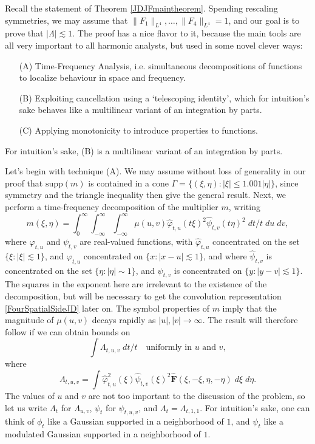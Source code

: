 \documentclass[12pt]{article}
\newcommand*{\F}{\mathbf{F}}
\begin{document}
Recall the statement of Theorem \ref{JDJFmaintheorem}. Spending rescaling symmetries, we may assume that $\| F_1 \|_{L^4}, \dots, \| F_4 \|_{L^4} = 1$, and our goal is to prove that $|\Lambda| \lesssim 1$. The proof has a nice flavor to it, because the main tools are all very important to all harmonic analysts, but used in some novel clever ways:
%
\begin{enumerate}
    \item[(A)] Time-Frequency Analysis, i.e. simultaneous decompositions of functions to localize behaviour in space and frequency.

    \item[(B)] Exploiting cancellation using a `telescoping identity', which for intuition's sake behaves like a multilinear variant of an integration by parts.

    \item[(C)] Applying monotonicity to introduce properties to functions.
\end{enumerate}
%
For intuition's sake, (B) is a multilinear variant of an integration by parts.

Let's begin with technique (A). We may assume without loss of generality in our proof that $\text{supp}(m)$ is contained in a cone $\Gamma = \{ (\xi,\eta): |\xi| \leq 1.001 |\eta| \}$, since symmetry and the triangle inequality then give the general result. Next, we perform a time-frequency decomposition of the multiplier $m$, writing
%
\[ m(\xi,\eta) = \int_0^\infty \int_{-\infty}^\infty \int_{-\infty}^\infty \mu(u,v) \widehat{\varphi}_{t,u}(t\xi)^2 \widehat{\psi}_{t,v}(t\eta)^2\; dt/t\; du\; dv, \]
%
where $\varphi_{t,u}$ and $\psi_{t,v}$ are real-valued functions, with $\widehat{\varphi}_{t,u}$ concentrated on the set $\{ \xi : |\xi| \lesssim 1 \}$, and $\varphi_{t,u}$ concentrated on $\{ x : |x - u| \lesssim 1 \}$, and where $\widehat{\psi}_{t,v}$ is concentrated on the set $\{ \eta : |\eta| \sim 1 \}$, and $\psi_{t,v}$ is concentrated on $\{ y : |y - v| \lesssim 1 \}$. The squares in the exponent here are irrelevant to the existence of the decomposition, but will be necessary to get the convolution representation \eqref{FourSpatialSideJD} later on. The symbol properties of $m$ imply that the magnitude of $\mu(u,v)$ decays rapidly as $|u|, |v| \to \infty$. The result will therefore follow if we can obtain bounds on
%
\[ \int \Lambda_{t,u,v}\; dt/t \quad\text{uniformly in $u$ and $v$}, \]
%
where
%
\[ \Lambda_{t,u,v} = \int \widehat{\varphi}_{t,u}^2(\xi) \widehat{\psi}_{t,v}(\xi)^2 \widehat{\F}(\xi,-\xi,\eta,-\eta)\; d\xi\; d\eta. \]
%
The values of $u$ and $v$ are not too important to the discussion of the problem, so let us write $\Lambda_t$ for $\Lambda_{u,v}$, $\psi_t$ for $\psi_{t,u,v}$, and $\Lambda_t = \Lambda_{t,1,1}$. For intuition's sake, one can think of $\phi_t$ like a Gaussian supported in a neighborhood of $1$, and $\psi_t$ like a modulated Gaussian supported in a neighborhood of $1$.
\end{document}
